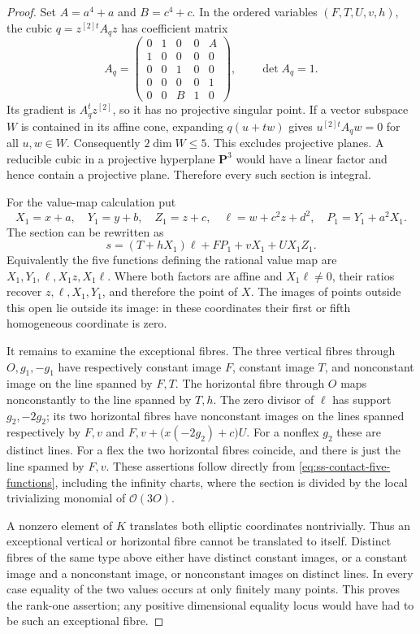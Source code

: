 \begin{proof}
Set $A=a^4+a$ and $B=c^4+c$. In the ordered variables $(F,T,U,v,h)$,
the cubic $q=z^{[2]t}A_qz$ has coefficient matrix
\[
 A_q=\begin{pmatrix}
 0&1&0&0&A\\
 1&0&0&0&0\\
 0&0&1&0&0\\
 0&0&0&0&1\\
 0&0&B&1&0
 \end{pmatrix},\qquad \det A_q=1.
\]
Its gradient is $A_q^t z^{[2]}$, so it has no projective singular
point. If a vector subspace $W$ is contained in its affine cone,
expanding $q(u+t w)$ gives
$u^{[2]t}A_qw=0$ for all $u,w\in W$.
Consequently $2\dim W\le5$. This excludes projective planes.
A reducible cubic in a projective hyperplane $\mathbf P^3$ would
have a linear factor and hence contain a projective plane. Therefore
every such section is integral.

For the value-map calculation put
\[
 X_1=x+a,\quad Y_1=y+b,\quad Z_1=z+c,\quad
 \ell=w+c^2z+d^2,\quad P_1=Y_1+a^2X_1.
\]
The section can be rewritten as
\begin{equation}\label{eq:ss-contact-five-functions}
       s=(T+hX_1)\ell+FP_1+vX_1+UX_1Z_1.
\end{equation}
Equivalently the five functions defining the rational value map are
$X_1,Y_1,\ell,X_1z,X_1\ell$.
Where both factors are affine and $X_1\ell\ne0$, their ratios
recover $z,\ell,X_1,Y_1$, and therefore the point of $X$.
The images of points outside this open lie outside its image: in
these coordinates their first or fifth homogeneous coordinate is zero.

It remains to examine the exceptional fibres. The three vertical
fibres through $O,g_1,-g_1$ have respectively constant image $F$,
constant image $T$, and nonconstant image on the line spanned by
$F,T$. The horizontal fibre through $O$ maps nonconstantly to the
line spanned by $T,h$. The zero divisor of $\ell$ has support
$g_2,-2g_2$; its two horizontal fibres have nonconstant images on
the lines spanned respectively by $F,v$ and
$F,v+\bigl(x(-2g_2)+c\bigr)U$.
For a nonflex $g_2$ these are distinct lines. For a flex the two
horizontal fibres coincide, and there is just the line spanned by
$F,v$. These assertions follow directly from
\eqref{eq:ss-contact-five-functions}, including the infinity
charts, where the section is divided by the local trivializing
monomial of $\mathcal O(3O)$.

A nonzero element of $K$ translates both elliptic coordinates
nontrivially. Thus an exceptional vertical or horizontal fibre cannot
be translated to itself. Distinct fibres of the same type above
either have distinct constant images, or a constant image and a
nonconstant image, or nonconstant images on distinct lines.
In every case equality of the two values occurs at only finitely
many points. This proves the rank-one assertion; any positive
dimensional equality locus would have had to be such an exceptional
fibre.


\end{proof}
